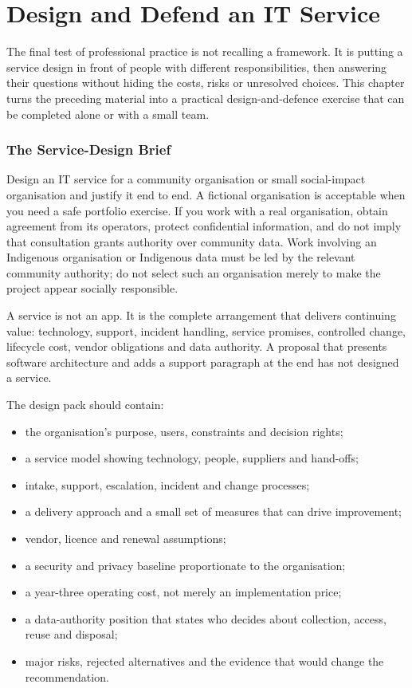 
\chapter{Design and Defend an IT Service}

The final test of professional practice is not recalling a framework. It is putting a service design in front of people with different responsibilities, then answering their questions without hiding the costs, risks or unresolved choices. This chapter turns the preceding material into a practical design-and-defence exercise that can be completed alone or with a small team.



\subsection{The Service-Design Brief}


Design an IT service for a community organisation or small social-impact organisation and justify it end to end. A fictional organisation is acceptable when you need a safe portfolio exercise. If you work with a real organisation, obtain agreement from its operators, protect confidential information, and do not imply that consultation grants authority over community data. Work involving an Indigenous organisation or Indigenous data must be led by the relevant community authority; do not select such an organisation merely to make the project appear socially responsible.


A service is not an app. It is the complete arrangement that delivers continuing value: technology, support, incident handling, service promises, controlled change, lifecycle cost, vendor obligations and data authority. A proposal that presents software architecture and adds a support paragraph at the end has not designed a service.


The design pack should contain:


\begin{itemize}[leftmargin=*]
\item the organisation's purpose, users, constraints and decision rights;
\item a service model showing technology, people, suppliers and hand-offs;
\item intake, support, escalation, incident and change processes;
\item a delivery approach and a small set of measures that can drive improvement;
\item vendor, licence and renewal assumptions;
\item a security and privacy baseline proportionate to the organisation;
\item a year-three operating cost, not merely an implementation price;
\item a data-authority position that states who decides about collection, access, reuse and disposal;
\item major risks, rejected alternatives and the evidence that would change the recommendation.
\end{itemize}

